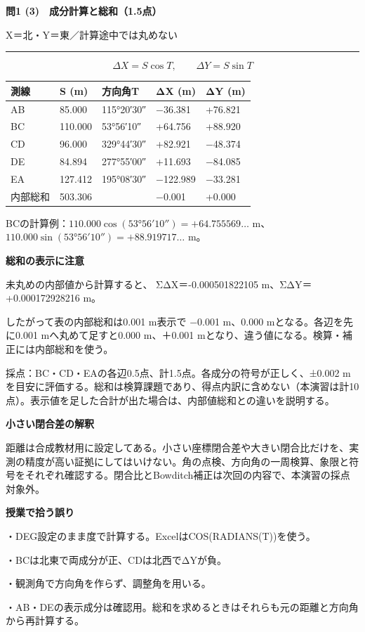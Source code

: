 \documentclass[a4paper,10pt]{article}
\newcommand{\ttl}[2]{{\color{navy}\Large\bfseries #1}\par{\small #2}\par\vspace{2pt}\hrule\vspace{7pt}}
\newcommand{\note}[1]{{\small\color{blue}#1}\par}
\begin{document}
\ttl{問1 (3)　成分計算と総和（1.5点）}{X＝北・Y＝東／計算途中では丸めない}
\[\Delta X=S\cos T,\qquad \Delta Y=S\sin T\]
\begin{center}\small\begin{tabular}{|l|l|l|l|l|}
\hline
\textbf{測線} & \textbf{S (m)} & \textbf{方向角T} & \textbf{ΔX (m)} & \textbf{ΔY (m)} \\ \hline
AB & 85.000 & 115°20′30″ & −36.381 & +76.821 \\ \hline
BC & 110.000 & 53°56′10″ & +64.756 & +88.920 \\ \hline
CD & 96.000 & 329°44′30″ & +82.921 & −48.374 \\ \hline
DE & 84.894 & 277°55′00″ & +11.693 & −84.085 \\ \hline
EA & 127.412 & 195°08′30″ & −122.989 & −33.281 \\ \hline
内部総和 & 503.306 &  & −0.001 & +0.000 \\ \hline
\end{tabular}\end{center}
BCの計算例：$110.000\cos(53°56′10″)=+64.755569\ldots$ m、
$110.000\sin(53°56′10″)=+88.919717\ldots$ m。

\textbf{総和の表示に注意}

未丸めの内部値から計算すると、
ΣΔX＝-0.000501822105 m、ΣΔY＝+0.000172928216 m。

したがって表の内部総和は0.001 m表示で −0.001 m、0.000 mとなる。各辺を先に0.001 mへ丸めて足すと0.000 m、＋0.001 mとなり、違う値になる。検算・補正には内部総和を使う。

\note{採点：BC・CD・EAの各辺0.5点、計1.5点。各成分の符号が正しく、±0.002 mを目安に評価する。総和は検算課題であり、得点内訳に含めない（本演習は計10点）。表示値を足した合計が出た場合は、内部値総和との違いを説明する。}
\textbf{小さい閉合差の解釈}

距離は合成教材用に設定してある。小さい座標閉合差や大きい閉合比だけを、実測の精度が高い証拠にしてはいけない。角の点検、方向角の一周検算、象限と符号をそれぞれ確認する。閉合比とBowditch補正は次回の内容で、本演習の採点対象外。

\textbf{授業で拾う誤り}

・DEG設定のまま度で計算する。ExcelはCOS(RADIANS(T))を使う。

・BCは北東で両成分が正、CDは北西でΔYが負。

・観測角で方向角を作らず、調整角を用いる。

・AB・DEの表示成分は確認用。総和を求めるときはそれらも元の距離と方向角から再計算する。
\end{document}
